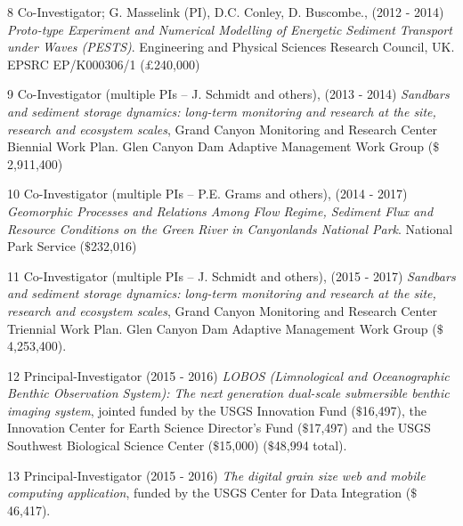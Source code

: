 \documentclass[margin,line]{resume}
\begin{document}
\begin{resume}
\begin{footnotesize}
\begin{list1}
	\item[8] Co-Investigator; G. Masselink (PI), D.C. Conley, D. Buscombe., (2012 - 2014) {\sl Proto-type Experiment and Numerical Modelling of Energetic Sediment Transport under Waves (PESTS)}. Engineering and Physical Sciences Research Council, UK. EPSRC EP/K000306/1 ($\pounds$240,000)\\

	\item[9] Co-Investigator (multiple PIs – J. Schmidt and others), (2013 - 2014) {\sl Sandbars and sediment storage dynamics: long-term monitoring and research at the site, research and ecosystem scales}, Grand Canyon Monitoring and Research Center Biennial Work Plan. Glen Canyon Dam Adaptive Management Work Group ($\$$2,911,400)\\

	\item[10] Co-Investigator (multiple PIs – P.E. Grams and others), (2014 - 2017) {\sl Geomorphic Processes and Relations Among Flow Regime, Sediment Flux and Resource Conditions on the Green River in Canyonlands National Park}. National Park Service ($\$$232,016)\\

	\item[11] Co-Investigator (multiple PIs – J. Schmidt and others), (2015 - 2017) {\sl Sandbars and sediment storage dynamics: long-term monitoring and research at the site, research and ecosystem scales}, Grand Canyon Monitoring and Research Center Triennial Work Plan. Glen Canyon Dam Adaptive Management Work Group ($\$$4,253,400).\\

	\item[12] Principal-Investigator (2015 - 2016) {\sl LOBOS (Limnological and Oceanographic Benthic Observation System): The next generation dual-scale submersible benthic imaging system}, jointed funded by the USGS Innovation Fund ($\$$16,497), the Innovation Center for Earth Science Director's Fund ($\$$17,497) and the USGS Southwest Biological Science Center ($\$$15,000) ($\$$48,994 total).\\

	\item[13] Principal-Investigator (2015 - 2016) {\sl The digital grain size web and mobile computing application}, funded by the USGS Center for Data Integration ($\$$46,417).

	\end{list1}
        \end{footnotesize}


\end{resume}
\end{document}
